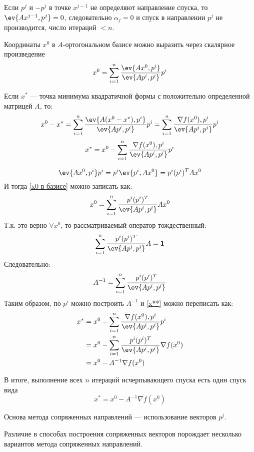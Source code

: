 \begin{remark}
    Если \(p^j\) и \(- p^j\) в точке \(x^{j - 1}\) не определяют направление спуска, то \(\ev{Ax^{j - 1}, p^j} = 0\), следовательно \(\alpha_j = 0\) и спуск в направлении \(p^j\) не производится, число итераций \(< n\).
\end{remark}

Координаты \(x^0\) в \(A\)-ортогональном базисе можно выразить через скалярное произведение
\begin{equation}
    x^0 = \sum_{i = 1}^n \frac{\ev{Ax^0, p^i}}{\ev{Ap^i, p^i}} p^i
    \label{x0 в базисе}
\end{equation}

Если \(x^*\) --- точка минимума квадратичной формы с положительно определенной матрицей \(A\), то:
\[x^0 - x^* = \sum_{i = 1}^n \frac{\ev{A(x^0 - x^*), p^i}}{\ev{Ap^i, p^i}} p^i = \sum_{i = 1}^n \frac{\nabla f(x^0), p^i}{\ev{Ap^i, p^i}} p^i\]
\begin{equation}
    x^* = x^0 - \sum_{i = 1}^n \frac{\nabla f(x^0), p^i}{\ev{Ap^i, p^i}} p^i
    \label{x**}
\end{equation}

\[\ev{Ax^0, p^i} p^i = p^i \ev{p^i, Ax^0} = p^i (p^i)^T Ax^0\]
И тогда \eqref{x0 в базисе} можно записать как:
\[x^0 = \sum_{i = 1}^n \frac{p^i (p^i)^T}{\ev{Ap^i, p^i}} Ax^0\]
Т.к. это верно \(\forall x^0\), то рассматриваемый оператор тождественный:
\[\sum_{i = 1}^n \frac{p^i (p^i)^T}{\ev{Ap^i, p^i}} A = \mathbf{1}\]
Следовательно:
\[A^{ - 1} = \sum_{i = 1}^n \frac{p^i (p^i)^T}{\ev{Ap^i, p^i}}\]
Таким образом, по \(p^i\) можно построить \(A^{ - 1}\) и \eqref{x**} можно переписать как:
\begin{align*}
    x^*
     & = x^0 - \sum_{i = 1}^n \frac{\nabla f(x^0), p^i}{\ev{Ap^i, p^i}} p^i    \\
     & = x^0 - \sum_{i = 1}^n \frac{p^i (p^i)^T}{\ev{Ap^i, p^i}} \nabla f(x^0) \\
     & = x^0 - A^{ - 1} \nabla f(x^0)                                          \\
\end{align*}

В итоге, выполнение всех \(n\) итераций исчерпывающего спуска есть один спуск вида
\[x^* = x^0 - A^{ - 1} \nabla f(x^0)\]

Основа метода сопряженных направлений --- использование векторов \(p^j\).

Различие в способах построения сопряженных векторов порождает несколько вариантов метода сопряженных направлений.

